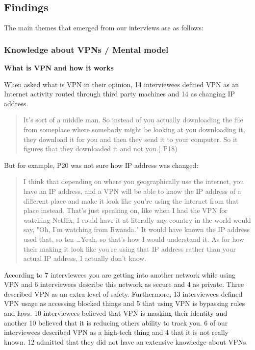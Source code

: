 \subsection{Findings}\label{Findings}
The main themes that emerged from our interviews are as follows: 

\subsubsection{Knowledge about VPNs / Mental model}

\textbf{What is VPN and how it works}

When asked what is VPN in their opinion, 14 interviewees defined VPN as an Internet activity routed through third party machines and 14 as changing IP address. 
\begin{quote}It's sort of a middle man. So instead of you actually downloading the file from someplace where somebody might be looking at you downloading it, they download it for you and then they send it to your computer. So it figures that they downloaded it and not you.( P18)\end{quote}


But for example, P20 was not sure how IP address was changed:
\begin{quote}I think that depending on where you geographically use the internet, you have an IP address, and a VPN will be able to know the IP address of a different place and make it look like you're using the internet from that place instead. That's just speaking on, like when I had the VPN for watching Netflix, I could have it at literally any country in the world would say, "Oh, I'm watching from Rwanda." It would have known the IP address used that, so ten \dots Yeah, so that's how I would understand it.
As for how their making it look like you're using that IP address rather than your actual IP address, I actually don't know.\end{quote}


According to 7 interviewees you are getting into another network while using VPN and 6 interviewees describe this network as secure and 4 as private. 
Three described VPN as an extra level of safety. Furthermore, 13 interviewees defined VPN usage as accessing blocked things and 5 that using VPN is bypassing rules and laws. 10 interviewees believed that VPN is masking their identity and another 10 believed that it is reducing others ability to track you.  6 of our interviewees described VPN as a high-tech thing and 4 that it is not really known. 12 admitted that they did not have an extensive knowledge about VPNs.

